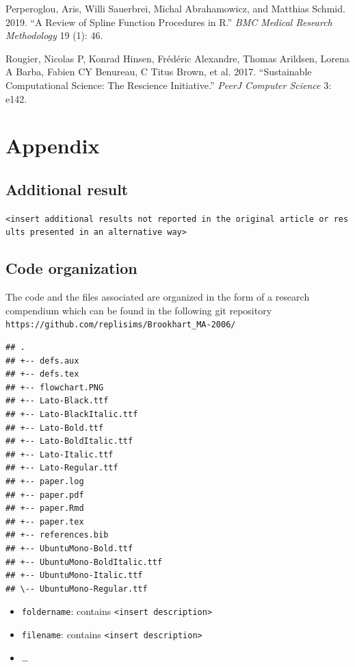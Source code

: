 \documentclass[10,a4paperpaper,]{article}
\begin{document}
\leavevmode\hypertarget{ref-perperoglou2019review}{}%
Perperoglou, Aris, Willi Sauerbrei, Michal Abrahamowicz, and Matthias
Schmid. 2019. ``A Review of Spline Function Procedures in R.'' \emph{BMC
Medical Research Methodology} 19 (1): 46.

\leavevmode\hypertarget{ref-rougier2017sustainable}{}%
Rougier, Nicolas P, Konrad Hinsen, Frédéric Alexandre, Thomas Arildsen,
Lorena A Barba, Fabien CY Benureau, C Titus Brown, et al. 2017.
``Sustainable Computational Science: The Rescience Initiative.''
\emph{PeerJ Computer Science} 3: e142.

\FloatBarrier
\endgroup
\newpage

\section*{Appendix}

\subsection*{Additional result}

\texttt{\textless{}insert\ additional\ results\ not\ reported\ in\ the\ original\ article\ or\ results\ presented\ in\ an\ alternative\ way\textgreater{}}

\subsection{Code organization}

The code and the files associated are organized in the form of a
research compendium which can be found in the following git repository
\texttt{https://github.com/replisims/Brookhart\_MA-2006/}

\begin{verbatim}
## .
## +-- defs.aux
## +-- defs.tex
## +-- flowchart.PNG
## +-- Lato-Black.ttf
## +-- Lato-BlackItalic.ttf
## +-- Lato-Bold.ttf
## +-- Lato-BoldItalic.ttf
## +-- Lato-Italic.ttf
## +-- Lato-Regular.ttf
## +-- paper.log
## +-- paper.pdf
## +-- paper.Rmd
## +-- paper.tex
## +-- references.bib
## +-- UbuntuMono-Bold.ttf
## +-- UbuntuMono-BoldItalic.ttf
## +-- UbuntuMono-Italic.ttf
## \-- UbuntuMono-Regular.ttf
\end{verbatim}

\begin{itemize}
\tightlist
\item
  \texttt{foldername}: contains
  \texttt{\textless{}insert\ description\textgreater{}}
\item
  \texttt{filename}: contains
  \texttt{\textless{}insert\ description\textgreater{}}
\item
  \ldots{}
\end{itemize}
\end{document}
